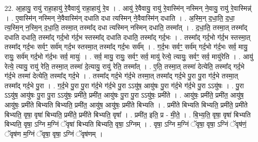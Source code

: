 \documentclass[17pt]{extarticle}
\begin{document}
22. आ॒हायु॒ रायु॑ राहा॒हायु॑ रे॒वैवायु॑ राहा॒हायु॑ रे॒व । . आयु॑ रे॒वैवायु॒ रायु॑ रे॒वास्मि॑न् नस्मिन् ने॒वायु॒ रायु॑ रे॒वास्मिन्न्॑ । . ए॒वास्मि॑न् नस्मिन् ने॒वैवास्मि॑न् दधाति दधा त्यस्मिन् ने॒वैवास्मि॑न् दधाति । . अ॒स्मि॒न् द॒धा॒ति॒ द॒धा॒ त्य॒स्मि॒न् न॒स्मि॒न् द॒धा॒ति॒ तस्मा॒त् तस्मा᳚द् दधा त्यस्मिन् नस्मिन् दधाति॒ तस्मा᳚त् । . द॒धा॒ति॒ तस्मा॒त् तस्मा᳚द् दधाति दधाति॒ तस्मा᳚द् गर्द॒भो ग॑र्द॒भ स्तस्मा᳚द् दधाति दधाति॒ तस्मा᳚द् गर्द॒भः । . तस्मा᳚द् गर्द॒भो ग॑र्द॒भ स्तस्मा॒त् तस्मा᳚द् गर्द॒भः सर्वꣳ॒॒ सर्व॑म् गर्द॒भ स्तस्मा॒त् तस्मा᳚द् गर्द॒भः सर्व᳚म् । . ग॒र्द॒भः सर्वꣳ॒॒ सर्व॑म् गर्द॒भो ग॑र्द॒भः सर्व॒ मायु॒ रायुः॒ सर्व॑म् गर्द॒भो ग॑र्द॒भः सर्व॒ मायुः॑ । . सर्व॒ मायु॒ रायुः॒ सर्वꣳ॒॒ सर्व॒ मायु॑ रेत्ये॒ त्यायुः॒ सर्वꣳ॒॒ सर्व॒ मायु॑रेति । . आयु॑ रेत्ये॒ त्यायु॒ रायु॑ रेति॒ तस्मा॒त् तस्मा॑ दे॒त्यायु॒ रायु॑ रेति॒ तस्मा᳚त् । . ए॒ति॒ तस्मा॒त् तस्मा॑ देत्येति॒ तस्मा᳚द् गर्द॒भे ग॑र्द॒भे तस्मा॑ देत्येति॒ तस्मा᳚द् गर्द॒भे । . तस्मा᳚द् गर्द॒भे ग॑र्द॒भे तस्मा॒त् तस्मा᳚द् गर्द॒भे पु॒रा पु॒रा ग॑र्द॒भे तस्मा॒त् तस्मा᳚द् गर्द॒भे पु॒रा । . ग॒र्द॒भे पु॒रा पु॒रा ग॑र्द॒भे ग॑र्द॒भे पु॒रा ऽऽयु॑ष॒ आयु॑षः पु॒रा ग॑र्द॒भे ग॑र्द॒भे पु॒रा ऽऽयु॑षः । . पु॒रा ऽऽयु॑ष॒ आयु॑षः पु॒रा पु॒रा ऽऽयु॑षः॒ प्रमी॑ते॒ प्रमी॑त॒ आयु॑षः पु॒रा पु॒रा ऽऽयु॑षः॒ प्रमी॑ते । . आयु॑षः॒ प्रमी॑ते॒ प्रमी॑त॒ आयु॑ष॒ आयु॑षः॒ प्रमी॑ते बिभ्यति बिभ्यति॒ प्रमी॑त॒ आयु॑ष॒ आयु॑षः॒ प्रमी॑ते बिभ्यति । . प्रमी॑ते बिभ्यति बिभ्यति॒ प्रमी॑ते॒ प्रमी॑ते बिभ्यति॒ वृषा॒ वृषा॑ बिभ्यति॒ प्रमी॑ते॒ प्रमी॑ते बिभ्यति॒ वृषा᳚ । . प्रमी॑त॒ इति॒ प्र - मी॒ते॒ । . बि॒भ्य॒ति॒ वृषा॒ वृषा॑ बिभ्यति बिभ्यति॒ वृषा॒ ऽग्नि म॒ग्निं ॅवृषा॑ बिभ्यति बिभ्यति॒ वृषा॒ ऽग्निम् । . वृषा॒ ऽग्नि म॒ग्निं ॅवृषा॒ वृषा॒ ऽग्निं ॅवृष॑णं॒ ॅवृष॑ण म॒ग्निं ॅवृषा॒ वृषा॒ ऽग्निं ॅवृष॑णम् । \newline
\end{document}

